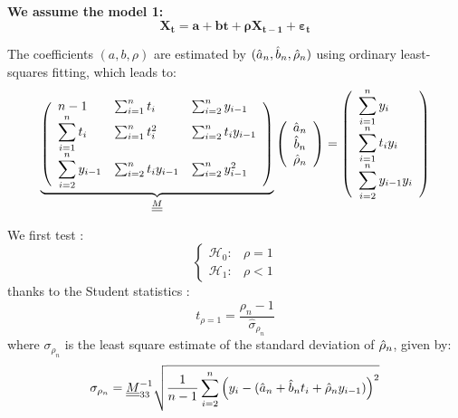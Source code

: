 {\bf We assume the model 1:}
\begin{equation}\label{Model1}
  \boldsymbol{X_t = a + bt + \rho  X_{t-1} + \varepsilon_{t}}
\end{equation}


The coefficients $(a,b,\rho)$ are estimated by $(\Hat{a}_n, \Hat{b}_n, \Hat{\rho}_n)$ using ordinary least-squares fitting, which leads to:
\begin{equation}\label{Model1Estim}
  \underbrace{\left(\begin{array}{lll}
      \displaystyle n-1 &\sum_{i=1}^n t_{i} &\sum_{i=2}^n y_{i-1}\\
      \displaystyle \sum_{i=1}^n t_{i} &\sum_{i=1}^n t_{i}^2 &\sum_{i=2}^n t_{i} y_{i-1}\\
      \displaystyle \sum_{i=2}^n y_{i-1}& \sum_{i=2}^n t_{i}y_{i-1} &\sum_{i=2}^n y_{i-1}^2
    \end{array}
    \right)}_{{\underline{\underline{M}}}}
  \left(\begin{array}{c}
    \hat{a}_n\\
    \hat{b}_n\\
    \hat{\rho}_n
  \end{array}
  \right)=
  \left(
  \begin{array}{l}
    \displaystyle \sum_{i=1}^n y_{i} \\
    \displaystyle \sum_{i=1}^n t_{i}  y_{i}\\
    \displaystyle \sum_{i=2}^n y_{i-1} y_{i}
  \end{array}
  \right)
\end{equation}

We first test :
\begin{equation}\label{TestModel1}
  \left\{
  \begin{array}{lr}
    \mathcal{H}_0 :  & \rho = 1 \\
    \mathcal{H}_1 : & \rho < 1
  \end{array}
  \right.
\end{equation}
thanks to the Student statistics :
\begin{equation}\label{stdtStat}
  t_{\rho=1} = \frac{\rho_n-1}{\hat{\sigma}_{\rho_n}}
\end{equation}
where $\sigma_{\rho_n}$ is the least square estimate of the standard deviation of $\Hat{\rho}_n$, given by:
\begin{equation}
  \sigma_{\rho_n}={\underline{\underline{M}}}^{-1}_{33}\sqrt{\frac{1}{n-1}\sum_{i=2}^n\left(y_{i}-(\hat{a}_n+\hat{b}_nt_i+\hat{\rho}_ny_{i-1})\right)^2}
\end{equation}

